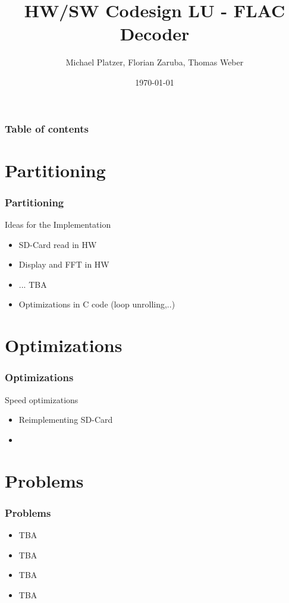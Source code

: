 \documentclass{beamer}
\begin{document}
\title[Entwurssprachen]{HW/SW Codesign LU - FLAC Decoder}
\author[Platzer M., Zaruba F., Weber T.]{Michael Platzer, Florian Zaruba, Thomas Weber}
\date{\today}

\begin{frame}
\titlepage
\end{frame}

\begin{frame}\frametitle{Table of contents}
  \tableofcontents
\end{frame}

\section{Partitioning} 
\begin{frame}\frametitle{Partitioning} 
Ideas for the Implementation
\begin{itemize}
	\item SD-Card read in HW
	\item Display and FFT in HW
	\item ... TBA
	\item Optimizations in C code (loop unrolling,..)
\end{itemize}
\end{frame}

\section{Optimizations}
\begin{frame}\frametitle{Optimizations}
Speed optimizations
\begin{itemize}
	\item Reimplementing SD-Card
	\item
\end{itemize}
\end{frame}


\section{Problems}
\begin{frame}\frametitle{Problems}
\begin{itemize}
	\item {TBA} 
	\item {TBA}
	\item {TBA}
	\item {TBA}
\end{itemize}
\end{frame}
\end{document}
